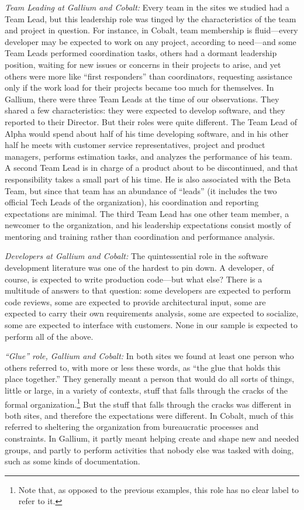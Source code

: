 \documentclass[10pt, conference, compsocconf]{IEEEtran}
\begin{document}
\emph{Team Leading at Gallium and Cobalt:} Every team in the sites we studied had a Team Lead, but this leadership role was tinged by the characteristics of the team and project in question. For instance, in Cobalt, team membership is fluid---every developer may be expected to work on any project, according to need---and some Team Leads performed coordination tasks, others had a dormant leadership position, waiting for new issues or concerns in their projects to arise, and yet others were more like ``first responders'' than coordinators, requesting assistance only if the work load for their projects became too much for themselves. In Gallium, there were three Team Leads at the time of our observations. They shared a few characteristics: they were expected to develop software, and they reported to their Director. But their roles were quite different. The Team Lead of Alpha would spend about half of his time developing software, and in his other half he meets with customer service representatives, project and product managers, performs estimation tasks, and analyzes the performance of his team. A second Team Lead is in charge of a product about to be discontinued, and that responsibility takes a small part of his time. He is also associated with the Beta Team, but since that team has an abundance of ``leads'' (it includes the two official Tech Leads of the organization), his coordination and reporting expectations are minimal. The third Team Lead has one other team member, a newcomer to the organization, and his leadership expectations consist mostly of mentoring and training rather than coordination and performance analysis.

\emph{Developers at Gallium and Cobalt:} The quintessential role in the software development literature was one of the hardest to pin down. A developer, of course, is expected to write production code---but what else? There is a multitude of answers to that question: some developers are expected to perform code reviews, some are expected to provide architectural input, some are expected to carry their own requirements analysis, some are expected to socialize, some are expected to interface with customers. None in our sample is expected to perform all of the above.

\emph{``Glue'' role, Gallium and Cobalt:} In both sites we found at least one person who others referred to, with more or less these words, as ``the glue that holds this place together.'' They generally meant a person that would do all sorts of things, little or large, in a variety of contexts, stuff that falls through the cracks of the formal organization.\footnote{Note that, as opposed to the previous examples, this role has no clear label to refer to it.} But the stuff that falls through the cracks was different in both sites, and therefore the expectations were different. In Cobalt, much of this referred to sheltering the organization from bureaucratic processes and constraints. In Gallium, it partly meant helping create and shape new and needed groups, and partly to perform activities that nobody else was tasked with doing, such as some kinds of documentation.
\end{document}
